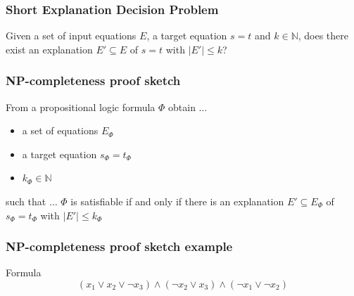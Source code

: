 \documentclass{beamer}
\begin{document}
\begin{frame}

\frametitle{Short Explanation Decision Problem}

\centering Given a set of input equations $E$, a target equation $s = t$ and $k \in \mathbb{N}$, does there exist an explanation $E' \subseteq E$ of $s = t$ with $|E'| \leq k$?


\end{frame}

\begin{frame}

\frametitle{NP-completeness proof sketch}

\begin{block}{From a propositional logic formula $\Phi$ obtain $\ldots$}

	\begin{itemize}
		\item a set of equations $E_{\Phi}$
		\item a target equation $s_{\Phi} = t_{\Phi}$
		\item $k_{\Phi} \in \mathbb{N}$
	\end{itemize}
\end{block}

\begin{block}{such that $\ldots$}
	$\Phi$ is satisfiable if and only if there is an explanation $E' \subseteq E_{\Phi}$ of $s_{\Phi} = t_{\Phi}$ with $|E'| \leq k_{\Phi}$
\end{block}


\end{frame}

\begin{frame}

\frametitle{NP-completeness proof sketch example}

\begin{block}{Formula}
$$(x_1 \vee x_2 \vee \neg x_3) \wedge (\neg x_2 \vee x_3) \wedge (\neg x_1 \vee \neg x_2)$$
\end{block}

\end{frame}
\end{document}

